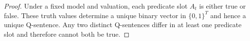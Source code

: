 \documentclass[10pt,a4paper]{amsart}
\begin{document}
\begin{proof}
Under a fixed model and valuation, each predicate slot $A_t$ is either true
or false. These truth values determine a unique binary vector in
$\{0,1\}^{T}$ and hence a unique Q-sentence. Any two distinct Q-sentences
differ in at least one predicate slot and therefore cannot both be true.
\end{proof}
\end{document}
